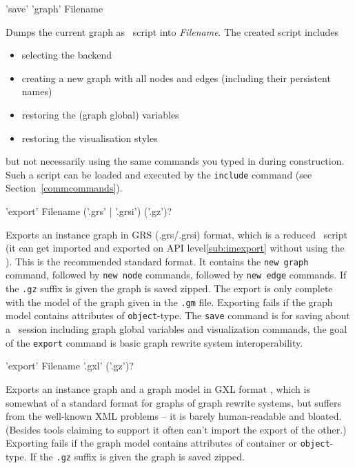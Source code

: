 \begin{rail}
  'save' 'graph' Filename
\end{rail}
Dumps the current graph as \GrShell\ script into \emph{Filename}.
The created script includes
\begin{itemize}
  \item selecting the backend
  \item creating a new graph with all nodes and edges (including their persistent names)
  \item restoring the (graph global) variables
  \item restoring the visualisation styles
\end{itemize}
but not necessarily using the same commands you typed in during construction.
Such a script can be loaded and executed by the \texttt{include} command (see Section~\ref{commcommands}).

\begin{rail}
  'export' Filename ('.grs' | '.grsi') ('.gz')?
\end{rail}
Exports an instance graph in GRS (.grs/.grsi) format, which is a reduced \GrShell\ script
(it can get imported and exported on API level\ref{sub:imexport} without using the \GrShell).
This is the recommended standard format.
It contains the \texttt{new graph} command, followed by \texttt{new node} commands, followed by \texttt{new edge} commands.
If the \texttt{.gz} suffix is given the graph is saved zipped.
The export is only complete with the model of the graph given in the \texttt{.gm} file.
Exporting fails if the graph model contains attributes of \texttt{object}-type.
The \texttt{save} command is for saving about a \GrShell\ session including graph global variables and visualization commands,
the goal of the \texttt{export} command is basic graph rewrite system interoperability.

\begin{rail}
  'export' Filename '.gxl' ('.gz')?
\end{rail}
Exports an instance graph and a graph model in GXL format \cite{GXL,GXL2},
which is somewhat of a standard format for graphs of graph rewrite systems,
but suffers from the well-known XML problems -- it is barely human-readable and bloated.
(Besides tools claiming to support it often can't import the export of the other.)
Exporting fails if the graph model contains attributes of container or \texttt{object}-type.
If the \texttt{.gz} suffix is given the graph is saved zipped.

